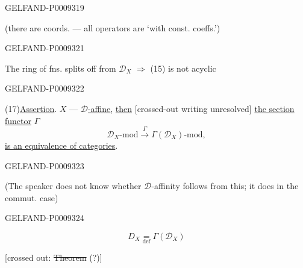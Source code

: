 \begin{GelfandAdjacentEvidence}{GELFAND-P000931}{9}


(there are coords. --- all operators are ‘with const. coeffs.’)
\end{GelfandAdjacentEvidence}



\begin{GelfandAdjacentEvidence}{GELFAND-P000932}{1}

The ring of fns. splits off from $\mathcal D_X$ $\Rightarrow$ (15) is not acyclic
\end{GelfandAdjacentEvidence}
\begin{GelfandAdjacentEvidence}{GELFAND-P000932}{2}


(17)\quad \underline{Assertion}. $X$ --- \underline{$\mathcal D$-affine}, \underline{then}
[crossed-out writing unresolved] \underline{the section functor} $\Gamma$
\begin{equation*}
 \mathcal D_X\text{-mod}\overset{\Gamma}{\longrightarrow}\Gamma(\mathcal D_X)\text{-mod},
 \tag{18}
\end{equation*}
\underline{is an equivalence of categories}.
\end{GelfandAdjacentEvidence}
\begin{GelfandAdjacentEvidence}{GELFAND-P000932}{3}


(The speaker does not know whether $\mathcal D$-affinity follows from this; it does in the commut. case)
\end{GelfandAdjacentEvidence}
\begin{GelfandAdjacentEvidence}{GELFAND-P000932}{4}


\begin{equation*}
 D_X\underset{\mathrm{def}}{=}\Gamma(\mathcal D_X)
 \tag{19}
\end{equation*}

[crossed out: \sout{Theorem} (?)]
\end{GelfandAdjacentEvidence}
